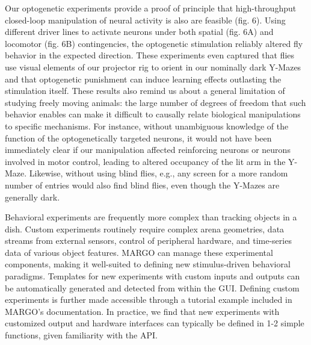 \documentclass[10pt]{article}
\begin{document}
\begin{multicols}{2}
Our optogenetic experiments provide a proof of principle that high-throughput closed-loop manipulation of neural activity is also are feasible (fig. 6). Using different driver lines to activate neurons under both spatial (fig. 6A) and locomotor (fig. 6B) contingencies, the optogenetic stimulation reliably altered fly behavior in the expected direction. These experiments even captured that flies use visual elements of our projector rig to orient in our nominally dark Y-Mazes and that optogenetic punishment can induce learning effects outlasting the stimulation itself. These results also remind us about a general limitation of studying freely moving animals: the large number of degrees of freedom that such behavior enables can make it difficult to causally relate biological manipulations to specific mechanisms. For instance, without unambiguous knowledge of the function of the optogenetically targeted neurons, it would not have been immediately clear if our manipulation affected reinforcing neurons or neurons involved in motor control, leading to altered occupancy of the lit arm in the Y-Maze. Likewise, without using blind flies, e.g., any screen for a more random number of entries would also find blind flies, even though the Y-Mazes are generally dark.

Behavioral experiments are frequently more complex than tracking objects in a dish. Custom experiments routinely require complex arena geometries, data streams from external sensors, control of peripheral hardware, and time-series data of various object features. MARGO can manage these experimental components, making it well-suited to defining new stimulus-driven behavioral paradigms. Templates for new experiments with custom inputs and outputs can be automatically generated and detected from within the GUI. Defining custom experiments is further made accessible through a tutorial example included in MARGO's documentation. In practice, we find that new experiments with customized output and hardware interfaces can typically be defined in 1-2 simple functions, given familiarity with the API.


\end{multicols}
\end{document}
